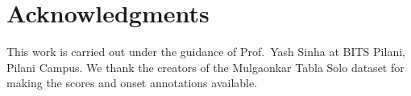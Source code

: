 \documentclass[11pt]{article}
\begin{document}
\section*{Acknowledgments}

This work is carried out under the guidance of Prof.\ Yash Sinha at BITS
Pilani, Pilani Campus. We thank the creators of the Mulgaonkar Tabla Solo
dataset for making the scores and onset annotations available.


\end{document}
